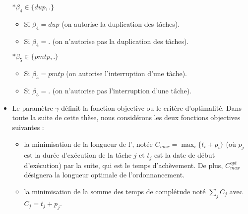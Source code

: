\documentclass[a4paper,11pt]{article}
\begin{document}
\begin{itemize}
        $\ast \beta_4 \in \{dup,.\}$

        \begin{itemize}

            \item Si $\beta_4=dup$ (on autorise la duplication des t\^aches).

            \item Si $\beta_4=.$ (on n'autorise pas la duplication des t\^aches).

        \end{itemize}



        $\ast \beta_5 \in \{pmtp,.\}$

        \begin{itemize}

            \item Si $\beta_5=pmtp$ (on autorise l'interruption d'une tâche).

            \item Si $\beta_5=.$ (on n'autorise pas l'interruption d'une tâche).

        \end{itemize}

    \item Le paramètre $\gamma$ définit la fonction objective ou le critère d'optimalité. Dans toute
        la suite de cette thèse, nous considérons les deux fonctions objectives suivantes :
        \begin{itemize}
            \item la minimisation de la longueur de l'\ordofin, notée $C_{max}=\max_i \{t_i+p_i\}$
                (où $p_j$ est la durée d'exécution de la tâche $j$ et $t_j$ est la date de début
                d'exécution) par la suite, qui est le temps d'achèvement. De plus, $C^{opt}_{max}$
                désignera la longueur optimale de l'ordonnancement.
            \item la minimisation de la somme des temps de complétude noté $\sum_{j} C_j$ avec
                $C_j=t_j+p_j$.
        \end{itemize}


\end{itemize}
\end{document}
